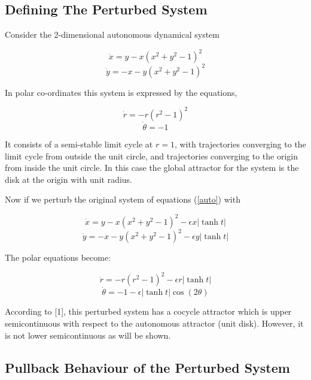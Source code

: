 \subsection{Defining The Perturbed System}

\begin{eg}
  Consider the 2-dimensional autonomous dynamical system

  \begin{equation}
    \dot{x} = y - x(x^{2} + y^{2} - 1)^{2}
    \label{auto}
  \end{equation}
  \[ \dot{y} = -x - y(x^{2} + y^{2} - 1)^{2} \]

  In polar co-ordinates this system is expressed by the equations,

  \begin{equation}
    \dot{r} = - r (r^{2} - 1)^2
    \label{autopolar1}
  \end{equation}
  \[ \dot{\theta} = -1 \]

It consists of a semi-stable limit cycle at $r = 1$, with trajectories
converging to the limit cycle from outside the unit circle, and
trajectories converging to the origin from inside the unit circle. In this
case the global attractor for the system is the disk at the origin with unit
radius.

  Now if we perturb the original system of equations (\ref{auto}) with

  \begin{equation}
    \dot{x} = y - x(x^{2} + y^{2} - 1)^{2} - \epsilon x  |\tanh t|
    \label{pert}
  \end{equation}
  \[ \dot{y} = -x - y(x^{2} + y^{2} - 1)^{2} - \epsilon y  |\tanh t| \]

  The polar equations become:

  \begin{equation}
    \dot{r} = - r (r^{2} - 1)^2 - \epsilon r |\tanh t|
    \label{autopolar2}
  \end{equation}
  \[ \dot{\theta} = -1 - \epsilon |\tanh t| \cos(2\theta) \]
\end{eg}

According to [1], this perturbed system has a cocycle attractor which is
upper semicontinuous with respect to the autonomous attractor (unit disk).
However, it is not lower semicontinuous as will be shown.


\subsection{Pullback Behaviour of the Perturbed System}

